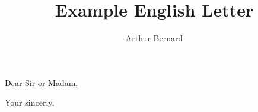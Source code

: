 \documentclass[a4paper]{arthur_letter}
\title{Example English Letter}
\author{Arthur Bernard}
\begin{document}
    \makeprofile %
    
    \address{John ,\\123, somestreet\\Somecity}

    \begin{letter}

            \subject{Subject of my letter}

            \opening{Dear Sir or Madam,}

            \lipsum[1-3]

            \closing{Your sincerly,} %


    \end{letter}
\end{document}

